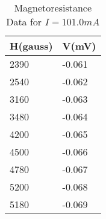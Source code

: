 \begin{table}[]
	\centering
	\begin{tabular}{|l|l|}
	\hline
		H(gauss) & V(mV) \\ \hline
		2390 & -0.061 \\ \hline
		2540 & -0.062 \\ \hline
		3160 & -0.063 \\ \hline
		3480 & -0.064 \\ \hline
		4200 & -0.065 \\ \hline
		4500 & -0.066 \\ \hline
		4780 & -0.067 \\ \hline
		5200 & -0.068 \\ \hline
		5180 & -0.069 \\ \hline
	\end{tabular}
	\caption{Magnetoresistance Data for $I=101.0mA$}
	\label{tab:mag2}
\end{table}
